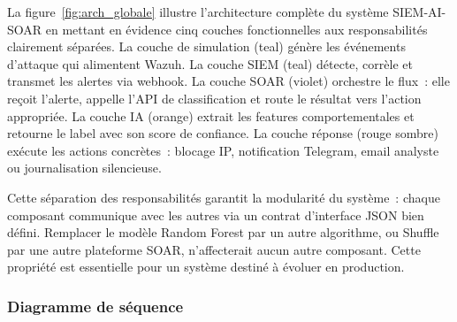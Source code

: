 \documentclass[12pt,a4paper]{report}
\begin{document}
La figure~\ref{fig:arch_globale} illustre l'architecture complète du système SIEM-AI-SOAR en mettant en évidence cinq couches fonctionnelles aux responsabilités clairement séparées. La couche de simulation (teal) génère les événements d'attaque qui alimentent Wazuh. La couche SIEM (teal) détecte, corrèle et transmet les alertes via webhook. La couche SOAR (violet) orchestre le flux~: elle reçoit l'alerte, appelle l'API de classification et route le résultat vers l'action appropriée. La couche IA (orange) extrait les features comportementales et retourne le label avec son score de confiance. La couche réponse (rouge sombre) exécute les actions concrètes~: blocage IP, notification Telegram, email analyste ou journalisation silencieuse.

Cette séparation des responsabilités garantit la modularité du système~: chaque composant communique avec les autres via un contrat d'interface JSON bien défini. Remplacer le modèle Random Forest par un autre algorithme, ou Shuffle par une autre plateforme SOAR, n'affecterait aucun autre composant. Cette propriété est essentielle pour un système destiné à évoluer en production.

\subsubsection{Diagramme de séquence}
\end{document}
